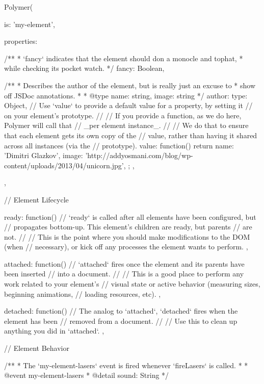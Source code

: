   Polymer({

    is: 'my-element',

    properties: {

      /**
       * `fancy` indicates that the element should don a monocle and tophat,
       * while checking its pocket watch.
       */
      fancy: Boolean,

      /**
       * Describes the author of the element, but is really just an excuse to
       * show off JSDoc annotations.
       *
       * @type {{name: string, image: string}}
       */
      author: {
        type: Object,
        // Use `value` to provide a default value for a property, by setting it
        // on your element's prototype.
        //
        // If you provide a function, as we do here, Polymer will call that
        // _per element instance_.
        //
        // We do that to ensure that each element gets its own copy of the
        // value, rather than having it shared across all instances (via the
        // prototype).
        value: function() {
          return {
            name:  'Dimitri Glazkov',
            image: 'http://addyosmani.com/blog/wp-content/uploads/2013/04/unicorn.jpg',
          };
        }
      },

    },

    // Element Lifecycle

    ready: function() {
      // `ready` is called after all elements have been configured, but
      // propagates bottom-up. This element's children are ready, but parents
      // are not.
      //
      // This is the point where you should make modifications to the DOM (when
      // necessary), or kick off any processes the element wants to perform.
    },

    attached: function() {
      // `attached` fires once the element and its parents have been inserted
      // into a document.
      //
      // This is a good place to perform any work related to your element's
      // visual state or active behavior (measuring sizes, beginning animations,
      // loading resources, etc).
    },

    detached: function() {
      // The analog to `attached`, `detached` fires when the element has been
      // removed from a document.
      //
      // Use this to clean up anything you did in `attached`.
    },

    // Element Behavior

    /**
     * The `my-element-lasers` event is fired whenever `fireLasers` is called.
     *
     * @event my-element-lasers
     * @detail {{sound: String}}
     */

}

